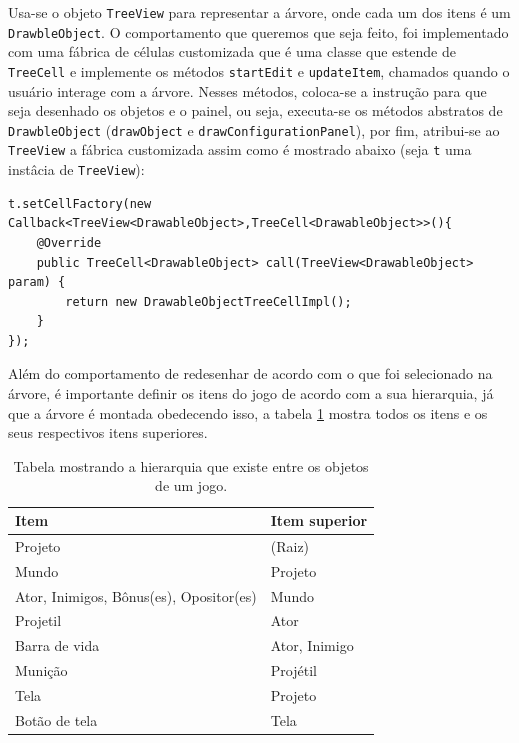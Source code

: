 \documentclass[12pt,twoside,openright,a4paper,english,brazil,sumario=tradicional]{abntex2}
\begin{document}
Usa-se o objeto \texttt{TreeView} para representar a árvore, onde cada um dos itens é um \texttt{DrawbleObject}. O comportamento que queremos que seja feito, foi implementado com uma fábrica de células customizada que é uma classe que estende de \texttt{TreeCell} e implemente os métodos \texttt{startEdit} e \texttt{updateItem}, chamados quando o usuário interage com a árvore. Nesses métodos, coloca-se a instrução para que seja desenhado os objetos e o painel, ou seja, executa-se os métodos abstratos de \texttt{DrawbleObject} (\texttt{drawObject} e \texttt{drawConfigurationPanel}),  por fim, atribui-se ao \texttt{TreeView} a fábrica customizada assim como é mostrado abaixo (seja \texttt{t} uma instâcia de \texttt{TreeView}):

\begin{lstlisting}[frame=single]
t.setCellFactory(new Callback<TreeView<DrawableObject>,TreeCell<DrawableObject>>(){
    @Override
    public TreeCell<DrawableObject> call(TreeView<DrawableObject> param) {
        return new DrawableObjectTreeCellImpl();
    }
});
\end{lstlisting}

Além do comportamento de redesenhar de acordo com o que foi selecionado na árvore, é importante definir os itens do jogo de acordo com a sua hierarquia, já que a árvore é montada obedecendo isso, a tabela \ref{table:obj-hierarquia} mostra todos os itens e os seus respectivos itens superiores.

\begin{table}[h]
   \centering
   \begin{tabular}{| p{8cm} | l | }
      \hline
      \textbf{Item} & \textbf{Item superior} \\
      \hline
      Projeto & (Raiz) \\
      Mundo & Projeto \\
      Ator, Inimigos, Bônus(es), Opositor(es) & Mundo \\
      Projetil & Ator \\
      Barra de vida & Ator, Inimigo \\
      Munição & Projétil \\
      Tela & Projeto \\
      Botão de tela & Tela \\
      \hline
   \end{tabular}
   \caption{Tabela mostrando a hierarquia que existe entre os objetos de um jogo.}
   \label{table:obj-hierarquia}
\end{table}
\end{document}

